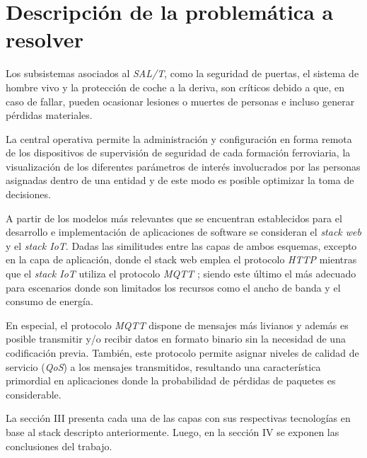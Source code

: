 \section{Descripción de la problemática a resolver}

Los subsistemas asociados al \textit{SAL/T}, como la seguridad de puertas, el sistema de hombre vivo y la protección de coche a la deriva, son críticos debido a que, en caso de fallar, pueden ocasionar lesiones o muertes de personas e incluso generar pérdidas materiales. 

La central operativa permite la administración y configuración en forma remota de los dispositivos de supervisión de seguridad de cada formación ferroviaria, la visualización de los diferentes parámetros de interés involucrados por las personas asignadas dentro de una entidad y de este modo es posible optimizar la toma de decisiones. 

A partir de los modelos más relevantes que se encuentran establecidos para el desarrollo e implementación de aplicaciones de software se consideran el \textit{stack web} y el \textit{stack IoT}. Dadas las similitudes entre las capas de ambos esquemas, excepto en la capa de aplicación, donde el stack web emplea el protocolo \textit{HTTP} \cite{b5} mientras que el \textit{stack IoT} utiliza el protocolo \textit{MQTT} \cite{b6}; siendo este último el más adecuado para escenarios donde son limitados los recursos como el ancho de banda y el consumo de energía.

En especial, el protocolo \textit{MQTT} dispone de mensajes más livianos y además es posible transmitir y/o recibir datos en formato binario sin la necesidad de una codificación previa. También, este protocolo permite asignar niveles de calidad de servicio (\textit{QoS}) \cite{b7} a los mensajes transmitidos, resultando una característica primordial en aplicaciones donde la probabilidad de pérdidas de paquetes es considerable.

La sección III presenta cada una de las capas con sus respectivas tecnologías en base al stack descripto anteriormente. Luego, en la sección IV se exponen las conclusiones del trabajo.


